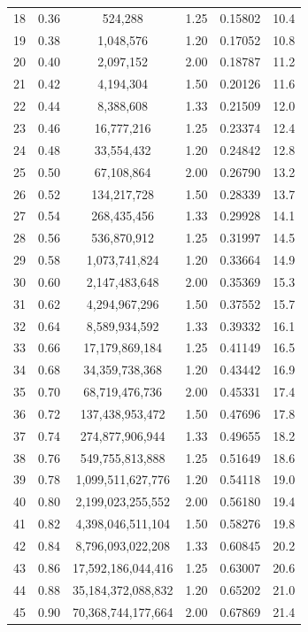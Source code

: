 \begin{small}
\begin{longtable}{@{}c c c c c c@{}}
  18 & 0.36 & 524,288 & 1.25 & 0.15802 & 10.4\\
  19 & 0.38 & 1,048,576 & 1.20 & 0.17052 & 10.8\\
  20 & 0.40 & 2,097,152 & 2.00 & 0.18787 & 11.2\\
  21 & 0.42 & 4,194,304 & 1.50 & 0.20126 & 11.6\\
  22 & 0.44 & 8,388,608 & 1.33 & 0.21509 & 12.0\\
  23 & 0.46 & 16,777,216 & 1.25 & 0.23374 & 12.4\\
  24 & 0.48 & 33,554,432 & 1.20 & 0.24842 & 12.8\\
  25 & 0.50 & 67,108,864 & 2.00 & 0.26790 & 13.2\\
  26 & 0.52 & 134,217,728 & 1.50 & 0.28339 & 13.7\\
  27 & 0.54 & 268,435,456 & 1.33 & 0.29928 & 14.1\\
  28 & 0.56 & 536,870,912 & 1.25 & 0.31997 & 14.5\\
  29 & 0.58 & 1,073,741,824 & 1.20 & 0.33664 & 14.9\\
  30 & 0.60 & 2,147,483,648 & 2.00 & 0.35369 & 15.3\\
  31 & 0.62 & 4,294,967,296 & 1.50 & 0.37552 & 15.7\\
  32 & 0.64 & 8,589,934,592 & 1.33 & 0.39332 & 16.1\\
  33 & 0.66 & 17,179,869,184 & 1.25 & 0.41149 & 16.5\\
  34 & 0.68 & 34,359,738,368 & 1.20 & 0.43442 & 16.9\\
  35 & 0.70 & 68,719,476,736 & 2.00 & 0.45331 & 17.4\\
  36 & 0.72 & 137,438,953,472 & 1.50 & 0.47696 & 17.8\\
  37 & 0.74 & 274,877,906,944 & 1.33 & 0.49655 & 18.2\\
  38 & 0.76 & 549,755,813,888 & 1.25 & 0.51649 & 18.6\\
  39 & 0.78 & 1,099,511,627,776 & 1.20 & 0.54118 & 19.0\\
  40 & 0.80 & 2,199,023,255,552 & 2.00 & 0.56180 & 19.4\\
  41 & 0.82 & 4,398,046,511,104 & 1.50 & 0.58276 & 19.8\\
  42 & 0.84 & 8,796,093,022,208 & 1.33 & 0.60845 & 20.2\\
  43 & 0.86 & 17,592,186,044,416 & 1.25 & 0.63007 & 20.6\\
  44 & 0.88 & 35,184,372,088,832 & 1.20 & 0.65202 & 21.0\\
  45 & 0.90 & 70,368,744,177,664 & 2.00 & 0.67869 & 21.4\\
\end{longtable}
\end{small}

